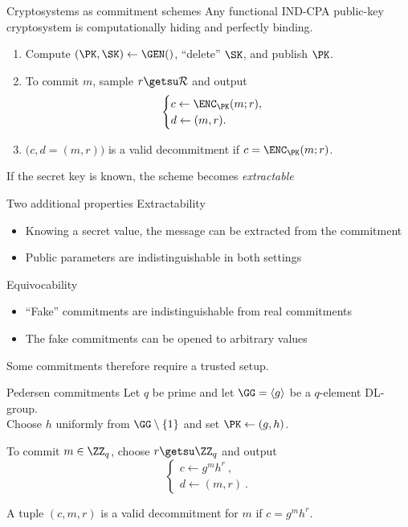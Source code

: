 \begin{frame}{Cryptosystems as commitment schemes}
  Any functional IND-CPA public-key cryptosystem is computationally hiding and perfectly binding.
  \begin{enumerate}[<+(1)->]
    \item Compute $(\PK, \SK) \gets \GEN()$, \enquote{delete} $\SK$, and publish $\PK$.
    \item To commit $m$, sample $r \getsu \mathcal{R}$ and output
    \[
      \begin{cases}
        c \gets \ENC_\PK(m; r),\\
        d \gets (m, r).
      \end{cases}
    \]
    \item $\bigl(c, d = (m, r)\bigr)$ is a valid decommitment if $c = \ENC_\PK(m; r)$.
  \end{enumerate}

  \pause
  If the secret key is known, the scheme becomes \emph{extractable}
\end{frame}

\begin{frame}{Two additional properties}
  Extractability
  \begin{itemize}[<+(1)->]
    \item Knowing a secret value, the message can be extracted from the commitment
    \item Public parameters are indistinguishable in both settings
  \end{itemize}

  \pause
  Equivocability
  \begin{itemize}[<+(1)->]
    \item \enquote{Fake} commitments are indistinguishable from real commitments
    \item The fake commitments can be opened to arbitrary values
  \end{itemize}

  \vspace*{1em}

  \pause
  Some commitments therefore require a trusted setup.
\end{frame}

\begin{frame}{Pedersen commitments}
  Let $q$ be prime and let $\GG = \langle g \rangle$ be a $q$-element DL-group.\\
  Choose $h$ uniformly from $\GG\setminus\{1\}$ and set $\PK \gets (g, h)$.

  \vfill

  \pause
  To commit $m \in \ZZ_q$, choose $r \getsu \ZZ_q$ and output
  \[
    \begin{cases}
      c \gets g^m h^r\ ,\\
      d \gets (m, r)\ .
    \end{cases}
  \]

  \vfill

  \pause
  A tuple $(c, m, r)$ is a valid decommitment for $m$ if $c = g^m h^r$.
\end{frame}

